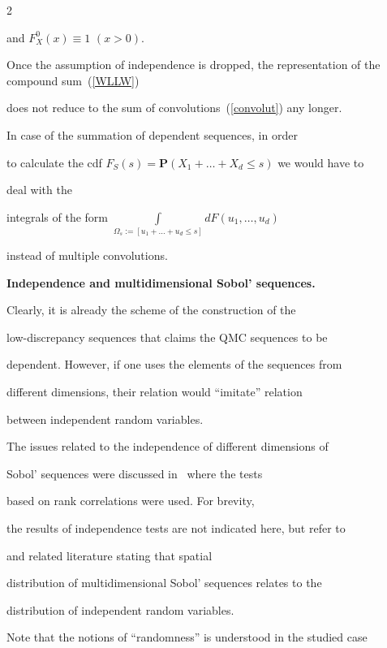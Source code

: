 \begin{multicols}{2}
\begin{equation}
\end{equation}

and $F_X^{0}(x)\equiv 1\,\,(x>0)$.



Once the assumption of independence is dropped, the representation of the compound sum~(\ref{WLLW})

does not reduce to the sum of convolutions~(\ref{convolut}) any longer.

In case of the summation of dependent sequences, in order

to calculate the cdf $F_S(s)=\mathbf{P}\left(X_1+\dots+X_d \leq s\right)$ we would have to

deal with the

integrals of the form $\int\limits_{\Omega_s:=\left[u_1+\dots+u_d\leq s\right]}dF(u_1,\dots,u_d)$

instead of multiple convolutions.



\medskip



\noindent

\textbf{Independence and multidimensional Sobol' sequences.}

Clearly, it is already the scheme of the construction of the

low-discrepancy sequences that claims the QMC sequences to be

dependent. However, if one uses the elements of the sequences from

different dimensions, their relation would ``imitate'' relation

between independent random variables.



The issues related to the independence of different dimensions of

Sobol' sequences were discussed in~\cite{Prakash} where the tests

based on rank correlations were used. For brevity,

the results of independence tests are not indicated here, but refer to~\cite{Prakash}

and related literature stating that spatial

distribution of multidimensional Sobol' sequences relates to the

distribution of independent random variables.



Note that the notions of ``randomness'' is understood in the studied case


\end{multicols}
